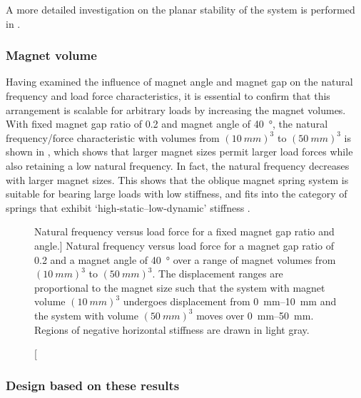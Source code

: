 \documentclass[11pt,a4paper]{memoir}
\begin{document}
A more detailed investigation on the planar stability of the system is performed in .


\subsubsection{Magnet volume}

Having examined the influence of magnet angle and magnet gap on the natural frequency and load force characteristics, it is essential to confirm that this arrangement is scalable for arbitrary loads by increasing the magnet volumes.
With fixed magnet gap ratio of 0.2 and magnet angle of \SI{40}{\degree}, the natural frequency/force characteristic with volumes from $(\SI{10}{mm})^3$ to $(\SI{50}{mm})^3$ is shown in , which shows that larger magnet sizes permit larger load forces while also retaining a low natural frequency.
In fact, the natural frequency decreases with larger magnet sizes.
This shows that the oblique magnet spring system is suitable for bearing large loads with low stiffness, and fits into the category of springs that exhibit `high-static--low-dynamic' stiffness \parencite[e.g.,][]{carrella2008-jsv}.

\begin{figure}
\centering
{}
\caption
[Natural frequency versus load force for a fixed magnet gap ratio and angle.]
{Natural frequency versus load force for a magnet gap ratio of \num{0.2} and a magnet angle of \SI{40}{\degree} over a range of magnet volumes from $(\SI{10}{mm})^3$ to $(\SI{50}{mm})^3$.
The displacement ranges are proportional to the magnet size such that the system with magnet volume $(\SI{10}{mm})^3$ undergoes displacement from \SIrange{0}{10}{mm} and the system with volume $(\SI{50}{mm})^3$ moves over \SIrange{0}{50}{mm}.
Regions of negative horizontal stiffness are drawn in light gray.}
\end{figure}

\subsubsection{Design based on these results}
\end{document}
